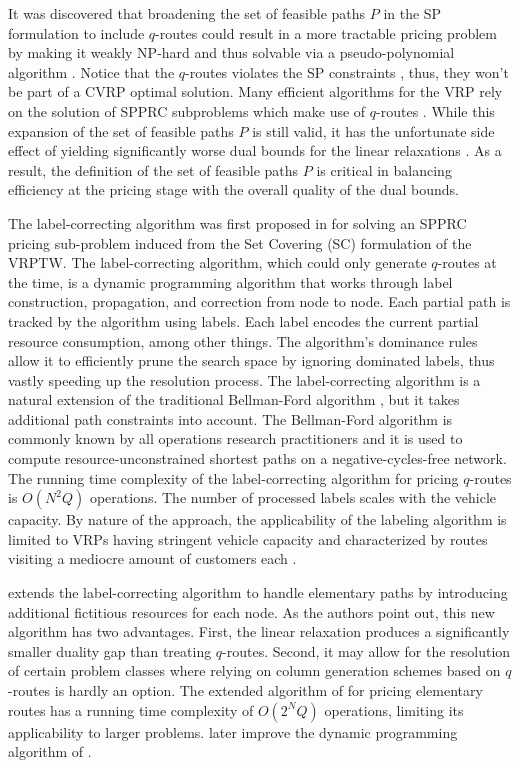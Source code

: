 It was discovered that broadening the set of feasible paths $P$
in the SP formulation to include $q$-routes could result
in a more tractable pricing problem
by making it weakly NP-hard
and thus solvable via a pseudo-polynomial algorithm \parencite{desrochers1988, irnich2005}.
Notice that the $q$-routes violates the SP constraints
,
thus, they won't be part of a CVRP optimal solution.
Many efficient algorithms for the VRP
rely on the solution of SPPRC subproblems which
make use of $q$-routes  \parencite{desrochers1992, fukasawa2006, contardo2011}.
While this expansion of the set of feasible paths $P$ is still valid,
it has the unfortunate side effect of yielding significantly
worse dual bounds for the linear relaxations \parencite{feillet2004}.
As a result,
the definition of the set of feasible paths $P$
is critical in balancing efficiency at the pricing stage
with the overall quality of the dual bounds.

The label-correcting algorithm was first proposed in \textcite{desrochers1992}
for solving an SPPRC pricing sub-problem induced from the Set Covering (SC) formulation of the VRPTW.
The label-correcting algorithm,
which could only generate $q$-routes at the time,
is a dynamic programming algorithm that works through
label construction, propagation, and correction from node to node.
Each partial path is tracked by the algorithm using labels.
Each label encodes the current partial resource consumption, among other things.
The algorithm’s dominance rules allow it to efficiently prune the search space
by ignoring dominated labels, thus vastly speeding up the resolution process.
The label-correcting algorithm is a natural extension of
the traditional Bellman-Ford algorithm \parencite{bellman1958, fordjr1956},
but it takes additional path constraints into account.
The Bellman-Ford algorithm is commonly known
by all operations research practitioners
and it is used to compute resource-unconstrained shortest paths
on a negative-cycles-free network.
The running time complexity of the label-correcting algorithm
for pricing $q$-routes is $O(N^2 Q)$ operations.
The number of processed labels scales with the vehicle capacity.
By nature of the approach,
the applicability of the labeling algorithm is limited to VRPs having stringent vehicle capacity
and characterized by routes visiting a mediocre amount of customers each \parencite{jepsen2008branchandcut}.

\textcite{feillet2004} extends the label-correcting algorithm
to handle elementary paths by introducing additional fictitious resources for each node.
As the authors point out, this new algorithm has two advantages.
First, the linear relaxation produces a significantly smaller duality gap than treating $q$-routes.
Second, it may allow for the resolution of certain problem classes
where relying on column generation schemes based on $q$-routes is hardly an option.
The extended algorithm of \citeauthor{feillet2004} for pricing elementary routes
has a running time complexity of $O(2^N Q)$ operations,
limiting its applicability to larger problems.
\textcite{righini2006} later improve the dynamic programming algorithm  of \citeauthor{feillet2004}.

